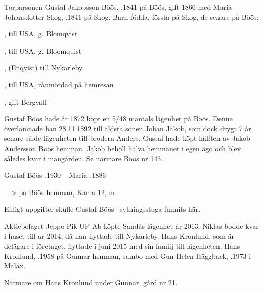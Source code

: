 Torparsonen Gustaf Jakobsson Böös, .1841 på Böös, gift 1866 med Maria Johansdotter Skog, .1841 på Skog. Barn födda, första på Skog, de senare på Böös:
\begin{jhchildren}
  \item {}
  \item {}, till USA, g. Blomqvist
  \item {}
  \item {}
  \item {}, till USA, g. Bloomquist
  \item {}, (Enqvist) till Nykarleby
  \item {}, till USA, rånmördad på hemresan
  \item {}, gift Bergvall
\end{jhchildren}
Gustaf Böös	 hade år 1872 köpt en 5/48 mantals lägenhet på Böös. Denne överlämnade han 28.11.1892 till äldsta sonen Johan Jakob, som			dock drygt 7 år senare sålde lägenheten till brodern Anders. Gustaf hade köpt hälften av Jakob Andersson Böös hemman. Jakob behöll halva hemmanet i egen ägo och blev således kvar i mangården. Se närmare Böös nr 143.

Gustaf Böös .1930  --  Maria .1886


--->  på Böös hemman, Karta 12, nr 

Enligt uppgifter skulle Gustaf Böös´ sytningsstuga funnits här.




Aktiebolaget Jeppo Pik-UP Ab köpte Sandås lägenhet år 2013. Niklas bodde kvar i huset till år 2014, då han flyttade till Nykarleby. Hans 		Kronlund, som är delägare i företaget, flyttade i juni 2015 med sin familj till lägenheten.
Hans Kronlund,  .1958 på Gunnar hemman, sambo med Gun-Helen Häggback, .1973 i Malax.
\begin{jhchildren}
  \item {}
  \item {}
  \item {}
\end{jhchildren}
Närmare om Hans Kronlund under Gunnar, gård nr 21.


